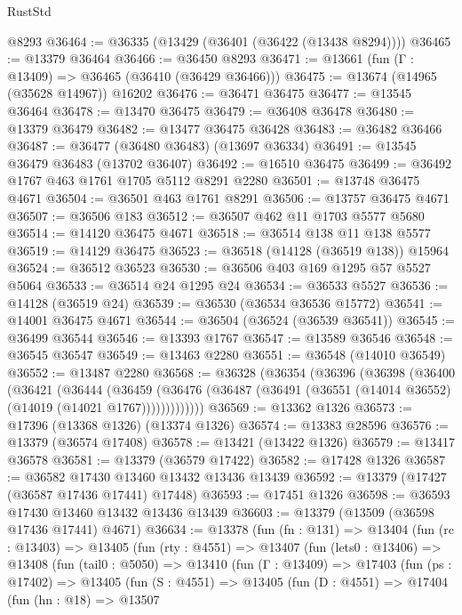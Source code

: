 \begin{lexlean}{RustStd}
\begin{coremodule}
    @8293
@36464 := @36335 (@13429 (@36401 (@36422 (@13438 @8294))))
@36465 := @13379 @36464
@36466 := @36450 @8293
@36471 := @13661 (fun (Γ : @13409) => @36465 (@36410 (@36429 @36466)))
@36475 := @13674 (@14965 (@35628 @14967)) @16202
@36476 := @36471 @36475
@36477 := @13545 @36464
@36478 := @13470 @36475
@36479 := @36408 @36478
@36480 := @13379 @36479
@36482 := @13477 @36475 @36428
@36483 := @36482 @36466
@36487 := @36477 (@36480 @36483) (@13697 @36334)
@36491 := @13545 @36479 @36483 (@13702 @36407)
@36492 := @16510 @36475
@36499 := @36492 @1767 @463 @1761 @1705 @5112 @8291 @2280
@36501 := @13748 @36475 @4671
@36504 := @36501 @463 @1761 @8291
@36506 := @13757 @36475 @4671
@36507 := @36506 @183
@36512 := @36507 @462 @11 @1703 @5577 @5680
@36514 := @14120 @36475 @4671
@36518 := @36514 @138 @11 @138 @5577
@36519 := @14129 @36475
@36523 := @36518 (@14128 (@36519 @138)) @15964
@36524 := @36512 @36523
@36530 := @36506 @403 @169 @1295 @57 @5527 @5064
@36533 := @36514 @24 @1295 @24
@36534 := @36533 @5527
@36536 := @14128 (@36519 @24)
@36539 := @36530 (@36534 @36536 @15772)
@36541 := @14001 @36475 @4671
@36544 := @36504 (@36524 (@36539 @36541))
@36545 := @36499 @36544
@36546 := @13393 @1767
@36547 := @13589 @36546
@36548 := @36545 @36547
@36549 := @13463 @2280
@36551 := @36548 (@14010 @36549)
@36552 := @13487 @2280
@36568 := @36328
    (@36354
      (@36396
        (@36398
          (@36400
            (@36421
              (@36444
                (@36459
                  (@36476 (@36487 (@36491 (@36551 (@14014 @36552) (@14019 (@14021 @1767)))))))))))))
@36569 := @13362 @1326
@36573 := @17396 (@13368 @1326) (@13374 @1326)
@36574 := @13383 @28596
@36576 := @13379 (@36574 @17408)
@36578 := @13421 (@13422 @1326)
@36579 := @13417 @36578
@36581 := @13379 (@36579 @17422)
@36582 := @17428 @1326
@36587 := @36582 @17430 @13460 @13432 @13436 @13439
@36592 := @13379 (@17427 (@36587 @17436 @17441) @17448)
@36593 := @17451 @1326
@36598 := @36593 @17430 @13460 @13432 @13436 @13439
@36603 := @13379 (@13509 (@36598 @17436 @17441) @4671)
@36634 := @13378
    (fun (fn : @131) =>
    @13404
      (fun (rc : @13403) =>
      @13405
        (fun (rty : @4551) =>
        @13407
          (fun (lets0 : @13406) =>
          @13408
            (fun (tail0 : @5050) =>
            @13410
              (fun (Γ : @13409) =>
              @17403
                (fun (ps : @17402) =>
                @13405
                  (fun (S : @4551) =>
                  @13405
                    (fun (D : @4551) =>
                    @17404
                      (fun (hn : @18) =>
                      @13507

\end{coremodule}
\end{lexlean}

